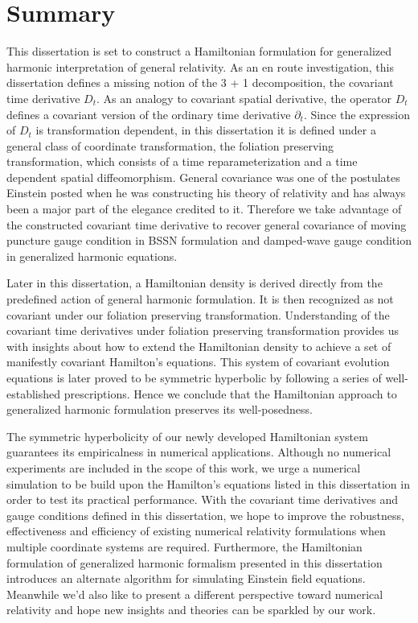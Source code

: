 \chapter{Summary}\label{summary}
This dissertation is set to construct a Hamiltonian formulation for generalized harmonic interpretation of general relativity. As an en route investigation, this dissertation defines a missing notion of the 3 + 1 decomposition, the covariant time derivative $D_{t}$. As an analogy to covariant spatial derivative, the operator $D_{t}$ defines a covariant version of the ordinary time derivative $\partial_{t}$. Since the expression of $D_{t}$ is transformation dependent, in this dissertation it is defined under a general class of coordinate transformation, the foliation preserving transformation, which consists of a time reparameterization and a time dependent spatial diffeomorphism. General covariance was one of the postulates Einstein posted when he was constructing his theory of relativity and has always been a major part of the elegance credited to it. Therefore we take advantage of the constructed covariant time derivative to recover general covariance of moving puncture gauge condition in BSSN formulation and damped-wave gauge condition in generalized harmonic equations. 

Later in this dissertation, a Hamiltonian density is derived directly from the predefined action of general harmonic formulation. It is then recognized as not covariant under our foliation preserving transformation. Understanding of the covariant time derivatives under foliation preserving transformation provides us with insights about how to extend the Hamiltonian density to achieve a set of manifestly covariant Hamilton's equations. This system of covariant evolution equations is later proved to be symmetric hyperbolic by following a series of well-established prescriptions. Hence we conclude that the Hamiltonian approach to generalized harmonic formulation preserves its well-posedness. 

The symmetric hyperbolicity of our newly developed Hamiltonian system guarantees its empiricalness in numerical applications. Although no numerical experiments are included in the scope of this work, we urge a numerical simulation to be build upon the Hamilton's equations listed in this dissertation in order to test its practical performance. With the covariant time derivatives and gauge conditions defined in this dissertation, we hope to improve the robustness, effectiveness and efficiency of existing numerical relativity formulations when multiple coordinate systems are required. Furthermore, the Hamiltonian formulation of generalized harmonic formalism presented in this dissertation introduces an alternate algorithm for simulating Einstein field equations. Meanwhile we'd also like to present a different perspective toward numerical relativity and hope new insights and theories can be sparkled by our work. 
